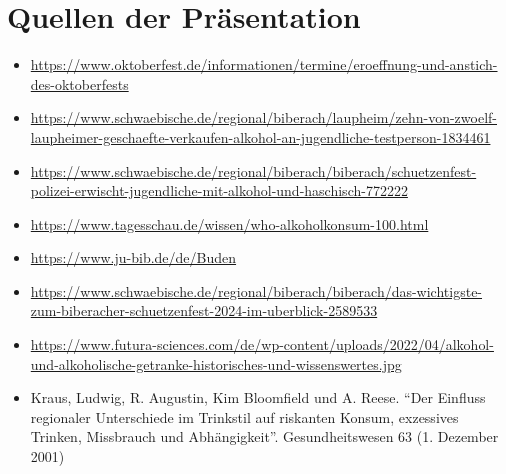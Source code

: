 \documentclass[12pt]{article}
\begin{document}
\section*{Quellen der Präsentation}
\begin{itemize}
    \item \url{https://www.oktoberfest.de/informationen/termine/eroeffnung-und-anstich-des-oktoberfests}
    \item \url{https://www.schwaebische.de/regional/biberach/laupheim/zehn-von-zwoelf-laupheimer-geschaefte-verkaufen-alkohol-an-jugendliche-testperson-1834461}
    \item \url{https://www.schwaebische.de/regional/biberach/biberach/schuetzenfest-polizei-erwischt-jugendliche-mit-alkohol-und-haschisch-772222}
    \item \url{https://www.tagesschau.de/wissen/who-alkoholkonsum-100.html}
    \item \url{https://www.ju-bib.de/de/Buden}
    \item \url{https://www.schwaebische.de/regional/biberach/biberach/das-wichtigste-zum-biberacher-schuetzenfest-2024-im-uberblick-2589533}
    \item \url{https://www.futura-sciences.com/de/wp-content/uploads/2022/04/alkohol-und-alkoholische-getranke-historisches-und-wissenswertes.jpg}
    \item Kraus, Ludwig, R. Augustin, Kim Bloomfield und A. Reese. “Der Einfluss regionaler Unterschiede im Trinkstil auf riskanten Konsum, exzessives Trinken, Missbrauch und Abhängigkeit”. Gesundheitswesen 63 (1. Dezember 2001)
\end{itemize}
\end{document}
